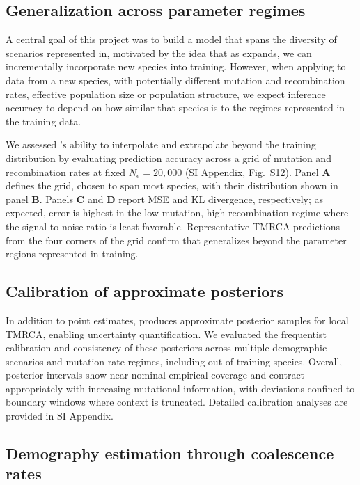 \documentclass[9pt,twocolumn,twoside]{pnas-new}
\begin{document}
\subsection*{Generalization across parameter regimes}

A central goal of this project was to build a model that spans the diversity of scenarios represented in\stdpopsim, 
motivated by the idea that as \stdpopsim expands, we can incrementally incorporate new species into training. 
However, when applying \cxtkit to data from a new species, with potentially different mutation and recombination rates, effective population size or population structure,
we expect inference accuracy to depend on how similar that species is to the regimes represented in the training data.

We assessed \cxtkit's ability to interpolate and extrapolate beyond the training distribution by evaluating prediction accuracy across a grid of mutation and recombination rates at fixed $N_e = 20{,}000$ (SI Appendix, Fig.~S12).
Panel \textbf{A} defines the grid, chosen to span most \stdpopsim species, with their distribution shown in panel \textbf{B}.
Panels \textbf{C} and \textbf{D} report MSE and KL divergence, respectively; as expected, error is highest in the low-mutation, high-recombination regime where the signal-to-noise ratio is least favorable.
Representative TMRCA predictions from the four corners of the grid confirm that \cxtkit generalizes beyond the parameter regions represented in training.



\subsection*{Calibration of approximate posteriors}
\label{sec:calibration}

In addition to point estimates, \cxtkit produces approximate posterior samples for local TMRCA, enabling uncertainty quantification. 
We evaluated the frequentist calibration and consistency of these posteriors across multiple demographic scenarios and mutation-rate regimes, including out-of-training species.
Overall, posterior intervals show near-nominal empirical coverage and contract appropriately with increasing mutational information, with deviations confined to boundary windows where context is truncated.
Detailed calibration analyses are provided in SI Appendix.



\subsection*{Demography estimation through coalescence rates}
\end{document}
